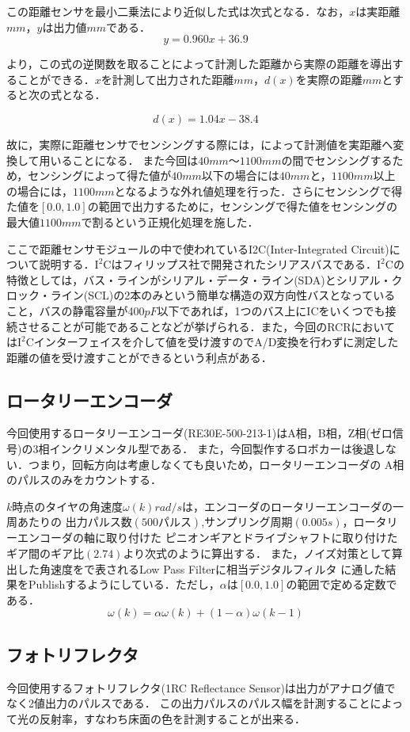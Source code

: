 この距離センサを最小二乗法により近似した式は次式となる．なお，$x$は実距離$\unit{mm}$，$y$は出力値$\unit{mm}$である．
\begin{equation}
  y = 0.960x + 36.9  \label{eq::1pf}
\end{equation}

より，この式の逆関数を取ることによって計測した距離から実際の距離を導出することができる．$x$を計測して出力された距離$\unit{mm}$，$d(x)$を実際の距離$\unit{mm}$とすると次の式となる．

\begin{equation}
  d(x) = 1.04x - 38.4 \label{eq::2pf}
\end{equation}

故に，実際に距離センサでセンシングする際には，によって計測値を実距離へ変換して用いることになる．
また今回は$40\unit{mm}$〜$1100\unit{mm}$の間でセンシングするため，センシングによって得た値が$40\unit{mm}$以下の場合には$40\unit{mm}$と，$1100\unit{mm}$以上の場合には，$1100\unit{mm}$となるような外れ値処理を行った．さらにセンシングで得た値を$[0.0,1.0]$の範囲で出力するために，センシングで得た値をセンシングの最大値$1100\unit{mm}$で割るという正規化処理を施した．

ここで距離センサモジュールの中で使われているI2C(Inter-Integrated Circuit)について説明する．$\mathrm{I^{2}C}$はフィリップス社で開発されたシリアスバスである．$\mathrm{I^{2}C}$の特徴としては，バス・ラインがシリアル・データ・ライン(SDA)とシリアル・クロック・ライン(SCL)の2本のみという簡単な構造の双方向性バスとなっていること，バスの静電容量が400$\unit{pF}$以下であれば，1つのバス上にICをいくつでも接続させることが可能であることなどが挙げられる．また，今回のRCRにおいては$\mathrm{I^{2}C}$インターフェイスを介して値を受け渡すのでA/D変換を行わずに測定した距離の値を受け渡すことができるという利点がある\cite{i2c}．

\subsection{ロータリーエンコーダ}
今回使用するロータリーエンコーダ(RE30E-500-213-1)はA相，B相，Z相(ゼロ信号)の3相インクリメンタル型である．
また，今回製作するロボカーは後退しない．つまり，回転方向は考慮しなくても良いため，ロータリーエンコーダの
A相のパルスのみをカウントする．

$k$時点のタイヤの角速度$\omega(k)\unit{rad/s}$は，エンコーダのロータリーエンコーダの一周あたりの
出力パルス数$(500パルス)$,サンプリング周期$(0.005\unit{s})$，ロータリーエンコーダの軸に取り付けた
ピニオンギアとドライブシャフトに取り付けたギア間のギア比$(2.74)$より次式のように算出する．
また，ノイズ対策として算出した角速度をで表されるLow Pass Filterに相当デジタルフィルタ
に通した結果をPublishするようにしている．ただし，$\alpha$は$[0.0,1.0]$の範囲で定める定数である．\\
      \begin{equation}
      	\omega(k)=\alpha\omega(k)+(1-\alpha)\omega(k-1) \label{eq::lpf}
      \end{equation}

\subsection{フォトリフレクタ}
今回使用するフォトリフレクタ(1RC Reflectance Sensor)は出力がアナログ値でなく2値出力のパルスである．
この出力パルスのパルス幅を計測することによって光の反射率，すなわち床面の色を計測することが出来る．
